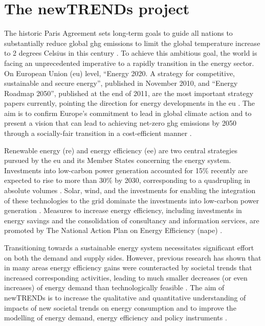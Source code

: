\section{The newTRENDs project}

The historic Paris Agreement sets long-term goals to guide all nations to substantially reduce global \gls{ghg} emissions to limit the global temperature increase to 2 degrees Celsius in this century \cite{paris}. 
To achieve this ambitious goal, the world is facing an unprecedented imperative to a rapidly transition in the energy sector. 
On European Union (\gls{eu}) level, “Energy 2020. A strategy for competitive, sustainable and secure energy”, published in November 2010, and “Energy Roadmap 2050”, published at the end of 2011, are the most important strategy papers currently, pointing the direction for energy developments in the \gls{eu} \cite{roadmap}. 
The aim is to confirm Europe's commitment to lead in global climate action and to present a vision that can lead to achieving net-zero \gls{ghg} emissions by 2050 through a socially-fair transition in a cost-efficient manner \cite{clean}. 

Renewable energy (\gls{re}) and energy efficiency (\gls{ee}) are two central strategies pursued by the \gls{eu} and its Member States concerning the energy system. 
Investments into low-carbon power generation accounted for 15\% recently are expected to rise to more than 30\% by 2030, corresponding to a quadrupling in absolute volumes \cite{shift}. Solar, wind, and the investments for enabling the integration of these technologies to the grid dominate the investments into low-carbon power generation \cite{shift}. 
Measures to increase energy efficiency, including investments in energy savings and the consolidation of consultancy and information services, are promoted by The National Action Plan on Energy Efficiency (\gls{nape}) \cite{bafa}.  

Transitioning towards a sustainable energy system necessitates significant effort on both the demand and supply sides. 
However, previous research has shown that in many areas energy efficiency gains were counteracted by societal trends that increased corresponding activities, leading to much smaller decreases (or even increases) of energy demand than technologically feasible \cite{2050}. 
The aim of newTRENDs is to increase the qualitative and quantitative understanding of impacts of new societal trends on energy consumption and to improve the modelling of energy demand, energy efficiency and policy instruments \cite{fraunhofer}. 


